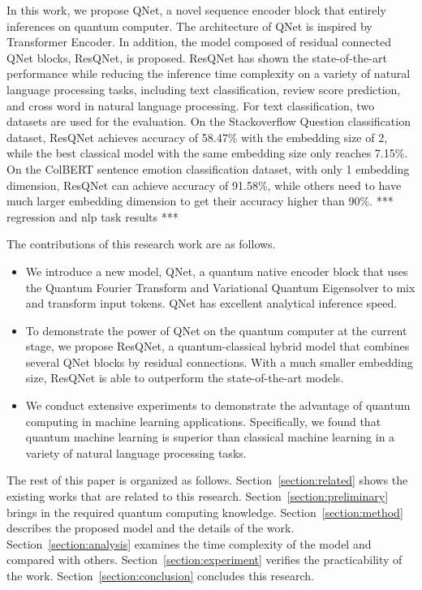 In this work, we propose QNet, a novel sequence encoder block that entirely inferences on quantum computer. The architecture of QNet is inspired by Transformer Encoder. In addition, the model composed of residual connected QNet blocks, ResQNet, is proposed. ResQNet has shown the state-of-the-art performance while reducing the inference time complexity on a variety of natural language processing tasks, including text classification, review score prediction, and cross word in natural language processing. 
For text classification, two datasets are used for the evaluation. On the Stackoverflow Question classification dataset, ResQNet achieves accuracy of 58.47\% with the embedding size of 2, while the best classical model with the same embedding size only reaches 7.15\%. On the ColBERT sentence emotion classification dataset, with only 1 embedding dimension, ResQNet can achieve accuracy of 91.58\%, while others need to have much larger embedding dimension to get their accuracy higher than 90\%. 
*** regression and nlp task results ***

The contributions of this research work are as follows.
\begin{itemize}
  \item We introduce a new model, QNet, a quantum native encoder block that uses the Quantum Fourier Transform and Variational Quantum Eigensolver to mix and transform input tokens. QNet has excellent analytical inference speed.
  \item To demonstrate the power of QNet on the quantum computer at the current stage, we propose ResQNet, a quantum-classical hybrid model that combines several QNet blocks by residual connections. With a much smaller embedding size, ResQNet is able to outperform the state-of-the-art models.
  \item We conduct extensive experiments to demonstrate the advantage of quantum computing in machine learning applications. Specifically, we found that quantum machine learning is superior than classical machine learning in a variety of natural language processing tasks.
\end{itemize}

The rest of this paper is organized as follows. Section~\ref{section:related} shows the existing works that are related to this research. Section~\ref{section:preliminary} brings in the required quantum computing knowledge. Section~\ref{section:method} describes the proposed model and the details of the work. Section~\ref{section:analysis} examines the time complexity of the model and compared with others. Section~\ref{section:experiment} verifies the practicability of the work. Section~\ref{section:conclusion} concludes this research.
